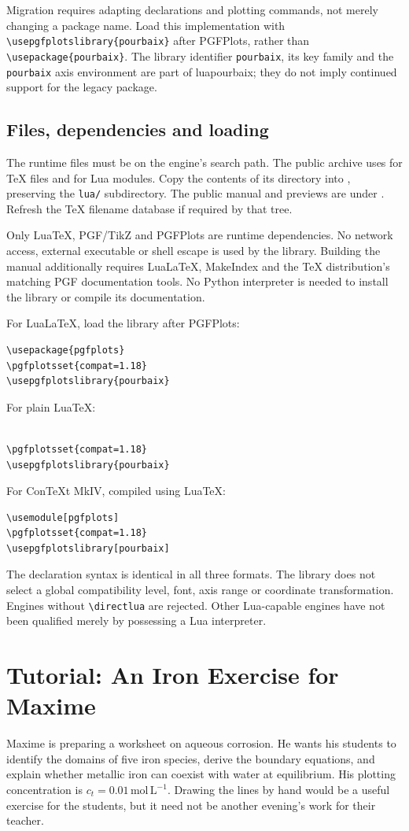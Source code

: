\documentclass[a4paper,11pt]{ltxdoc}
\begin{document}
Migration requires adapting declarations and plotting commands, not merely
changing a package name. Load this implementation with
\verb|\usepgfplotslibrary{pourbaix}| after PGFPlots, rather than
\verb|\usepackage{pourbaix}|. The library identifier \texttt{pourbaix}, its key
family and the \texttt{pourbaix} axis environment are part of luapourbaix;
they do not imply continued support for the legacy package.

\subsection{Files, dependencies and loading}
The runtime files must be on the engine's search path. The public archive uses
 for TeX files and  for Lua modules.
Copy the contents of its  directory into
, preserving the \texttt{lua/}
subdirectory. The public manual and previews are under .
Refresh the TeX filename database if required by that tree.

Only LuaTeX, PGF/TikZ and PGFPlots are runtime dependencies. No network access,
external executable or shell escape is used by the library. Building the manual additionally requires LuaLaTeX, MakeIndex and the TeX
distribution's matching PGF documentation tools. No Python interpreter is
needed to install the library or compile its documentation.

For LuaLaTeX, load the library after PGFPlots:
\begin{verbatim}
\usepackage{pgfplots}
\pgfplotsset{compat=1.18}
\usepgfplotslibrary{pourbaix}
\end{verbatim}
For plain LuaTeX:
\begin{verbatim}

\pgfplotsset{compat=1.18}
\usepgfplotslibrary{pourbaix}
\end{verbatim}
For ConTeXt MkIV, compiled using LuaTeX:
\begin{verbatim}
\usemodule[pgfplots]
\pgfplotsset{compat=1.18}
\usepgfplotslibrary[pourbaix]
\end{verbatim}
The declaration syntax is identical in all three formats. The library does not
select a global compatibility level, font, axis range or coordinate transformation.
Engines without \verb|\directlua| are rejected. Other Lua-capable engines have not
been qualified merely by possessing a Lua interpreter.

\section{Tutorial: An Iron Exercise for Maxime}
\label{sec:tutorial-iron}
Maxime is preparing a worksheet on aqueous corrosion. He wants his students to
identify the domains of five iron species, derive the boundary equations, and
explain whether metallic iron can coexist with water at equilibrium. His plotting
concentration is $c_t=0.01\,\mathrm{mol\,L^{-1}}$. Drawing the lines by hand would
be a useful exercise for the students, but it need not be another evening's work
for their teacher.
\end{document}
